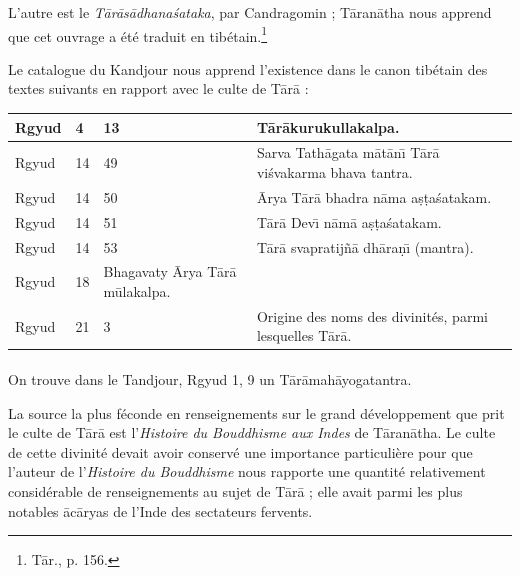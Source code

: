 \documentclass[a4paper, 11pt, oneside, french, landscape, twocolumn]{article}
\begin{document}
L'autre est le \emph{T\={a}r\={a}s\={a}dhana\'{s}ataka}, par Candragomin ; T\={a}ran\={a}tha nous apprend que cet ouvrage a été traduit en tibétain.\footnote{T\={a}r., p. 156.}

Le catalogue du Kandjour nous apprend l'existence dans le canon tibétain des textes suivants en rapport avec le culte de T\={a}r\={a} :
\begin{table}[H]
    \centering
    \scriptsize
    \bfseries
    \begin{tabular}{|l|l|p{15mm}|p{30mm}|}
    \hline
        Rgyud & 4 & 13 & T\={a}r\={a}kurukullakalpa. \\ \hline
        Rgyud & 14 & 49 & Sarva Tath\={a}gata m\={a}t\={a}n\={\i} T\={a}r\={a} vi\'{s}vakarma bhava tantra. \\ \hline
        Rgyud & 14 & 50 & \={A}rya T\={a}r\={a} bhadra n\={a}ma a\d{s}\d{t}a\'{s}atakam. \\ \hline 
        Rgyud & 14 & 51 & T\={a}r\={a} Dev\={\i} n\={a}m\={a} a\d{s}\d{t}a\'{s}atakam. \\ \hline
        Rgyud & 14 & 53 & T\={a}r\={a} svapratij\~{n}\={a} dh\={a}ra\d{n}\={\i} (mantra). \\ \hline 
        Rgyud & 18 & Bhagavaty \={A}rya T\={a}r\={a} m\={u}lakalpa. & ~ \\ \hline
        Rgyud & 21 & 3 & Origine des noms des divinités, parmi lesquelles T\={a}r\={a}. \\ \hline
    \end{tabular}
\end{table}
\paragraph{}
On trouve dans le Tandjour, Rgyud 1, 9 un T\={a}r\={a}mah\={a}yogatantra.

La source la plus féconde en renseignements sur le grand développement que prit le culte de T\={a}r\={a} est l'\emph{Histoire du Bouddhisme aux Indes} de T\={a}ran\={a}tha. Le culte de cette divinité devait avoir conservé une importance particulière pour que l'auteur de l'\emph{Histoire du Bouddhisme} nous rapporte une quantité relativement considérable de renseignements au sujet de T\={a}r\={a} ; elle avait parmi les plus notables \={a}c\={a}ryas de l'Inde des sectateurs fervents.
\end{document}
